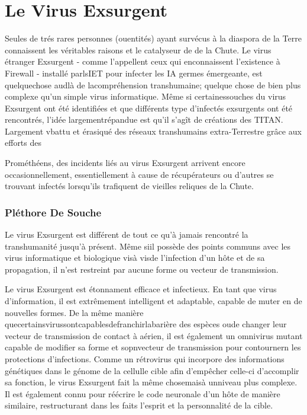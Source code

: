 \section{Le Virus Exsurgent } 

Seules de trés rares personnes (ouentités) ayant survécus à la diaspora de la Terre connaissent les véritables raisons et le catalyseur de de la Chute. Le virus étranger Exsurgent - comme l'appellent ceux qui enconnaissent l'existence à Firewall - installé parlsIET pour infecter les IA germes émergeante, est quelquechose audlà de lacompréhension transhumaine; quelque chose de bien plus complexe qu'un simple virus informatique. Même si certainessouches du virus Exsurgent ont été identifiées et que différents type d'infectés exsurgents ont été rencontrés, l'idée largementrépandue est qu'il s'agît de créations des TITAN. Largement vbattu et érasiqué des réseaux transhumains extra-Terrestre grâce aux efforts des 

Prométhéens, des incidents liés au virus Exsurgent arrivent encore occasionnellement, essentiellement à cause de récupérateurs ou d'autres se trouvant infectés lorsqu'ils trafiquent de vieilles reliques de la Chute. 

\subsubsection{Pléthore De Souche} 

Le virus Exsurgent est différent de tout ce qu'à jamais rencontré la transhumanité jusqu'à présent. Même siil possède des points communs avec les virus informatique et biologique visà visde l'infection d'un hôte et de sa propagation, il n'est restreint par aucune forme ou vecteur de transmission. 

Le virus Exsurgent est étonnament efficace et infectieux. En tant que virus d'information, il est extrêmement intelligent et adaptable, capable de muter en de nouvelles formes. De la même manière quecertainsvirussontcapablesdefranchirlabarière des espèces oude changer leur vecteur de transmission de contact à aérien, il est également un omnivirus mutant capable de modifier sa forme et sopnvecteur de transmission pour contournern les protections d'infections. Comme un rétrovirus qui incorpore des informations génétiques dans le génome de la cellulle cible afin d'empêcher celle-ci d'accomplir sa fonction, le virus Exsurgent fait la même chosemaisà unniveau plus complexe. Il est également connu pour réécrire le code neuronale d'un hôte de manière similaire, restructurant dans les faits l'esprit et la personnalité de la cible. 


